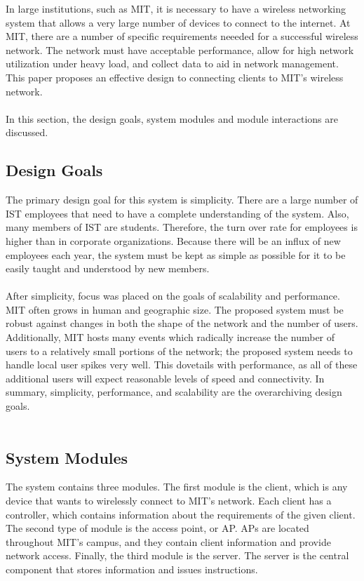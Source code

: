 \documentclass[10pt,journal,compsoc]{IEEEtran}
\begin{document}
		In large institutions, such as MIT, it is necessary to have a wireless networking system that allows a very large number of devices to connect to the internet. At MIT, there are a number of specific requirements neeeded for a successful wireless network. The network must have acceptable performance, allow for high network utilization under heavy load, and collect data to aid in network management. This paper proposes an effective design to connecting clients to MIT's wireless network.\\
        \\
        In this section, the design goals, system modules and module interactions are discussed.
        
        \subsection{Design Goals}
        
        The primary design goal for this system is simplicity. There are a large number of IST employees that need to have a complete understanding of the system. Also, many members of IST are students. Therefore, the turn over rate for employees is higher than in corporate organizations. Because there will be an influx of new employees each year, the system must be kept as simple as possible for it to be easily taught and understood by new members.\\
        \\
        After simplicity, focus was placed on the goals of scalability and performance. MIT often grows in human and geographic size. The proposed system must be robust against changes in both the shape of the network and the number of users. Additionally, MIT hosts many events which radically increase the number of users to a relatively small portions of the network; the proposed system needs to handle local user spikes very well. This dovetails with performance, as all of these additional users will expect reasonable levels of speed and connectivity. In summary, simplicity, performance, and scalability are the overarchiving design goals. \\
        \\
		\subsection{System Modules}
		The system contains three modules. The first module is the client, which is any device that wants to wirelessly connect to MIT's network. Each client has a controller, which contains information about the requirements of the given client. The second type of module is the access point, or AP. APs are located throughout MIT's campus, and they contain client information and provide network access. Finally, the third module is the server. The server is the central component that stores information and issues instructions.
		
\end{document}
